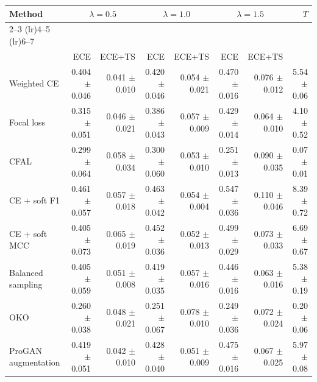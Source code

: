 \begin{tabular}{lrrrrrrr}
\toprule
Method & \multicolumn{2}{c}{$\lambda=0.5$} & \multicolumn{2}{c}{$\lambda=1.0$} & \multicolumn{2}{c}{$\lambda=1.5$} & $T$ \\ \cmidrule(lr){2--3} \cmidrule(lr){4--5} \cmidrule(lr){6--7}\\
 & ECE & ECE+TS & ECE & ECE+TS & ECE & ECE+TS & \\
\midrule
Weighted CE & \num{0.404} $\pm$ \num{0.046} & \num{0.041} $\pm$ \num{0.010} & \num{0.420} $\pm$ \num{0.046} & \num{0.054} $\pm$ \num{0.021} & \num{0.470} $\pm$ \num{0.016} & \num{0.076} $\pm$ \num{0.012} & \num{5.54} $\pm$ \num{0.06}\\
Focal loss & \num{0.315} $\pm$ \num{0.051} & \num{0.046} $\pm$ \num{0.021} & \num{0.386} $\pm$ \num{0.043} & \num{0.057} $\pm$ \num{0.009} & \num{0.429} $\pm$ \num{0.014} & \num{0.064} $\pm$ \num{0.010} & \num{4.10} $\pm$ \num{0.52}\\
CFAL & \num{0.299} $\pm$ \num{0.064} & \num{0.058} $\pm$ \num{0.034} & \num{0.300} $\pm$ \num{0.060} & \num{0.053} $\pm$ \num{0.010} & \num{0.251} $\pm$ \num{0.013} & \num{0.090} $\pm$ \num{0.035} & \num{0.07} $\pm$ \num{0.01}\\
CE + soft F1 & \num{0.461} $\pm$ \num{0.057} & \num{0.057} $\pm$ \num{0.018} & \num{0.463} $\pm$ \num{0.042} & \num{0.054} $\pm$ \num{0.004} & \num{0.547} $\pm$ \num{0.036} & \num{0.110} $\pm$ \num{0.046} & \num{8.39} $\pm$ \num{0.72}\\
CE + soft MCC & \num{0.405} $\pm$ \num{0.073} & \num{0.065} $\pm$ \num{0.019} & \num{0.452} $\pm$ \num{0.036} & \num{0.052} $\pm$ \num{0.013} & \num{0.499} $\pm$ \num{0.029} & \num{0.073} $\pm$ \num{0.033} & \num{6.69} $\pm$ \num{0.67}\\
Balanced sampling & \num{0.405} $\pm$ \num{0.059} & \num{0.051} $\pm$ \num{0.008} & \num{0.419} $\pm$ \num{0.035} & \num{0.057} $\pm$ \num{0.016} & \num{0.446} $\pm$ \num{0.016} & \num{0.063} $\pm$ \num{0.016} & \num{5.38} $\pm$ \num{0.19}\\
OKO & \num{0.260} $\pm$ \num{0.038} & \num{0.048} $\pm$ \num{0.021} & \num{0.251} $\pm$ \num{0.067} & \num{0.078} $\pm$ \num{0.010} & \num{0.249} $\pm$ \num{0.036} & \num{0.072} $\pm$ \num{0.024} & \num{0.20} $\pm$ \num{0.06}\\
ProGAN augmentation & \num{0.419} $\pm$ \num{0.051} & \num{0.042} $\pm$ \num{0.010} & \num{0.428} $\pm$ \num{0.040} & \num{0.051} $\pm$ \num{0.009} & \num{0.475} $\pm$ \num{0.016} & \num{0.067} $\pm$ \num{0.025} & \num{5.97} $\pm$ \num{0.08}\\
\bottomrule
\end{tabular}
